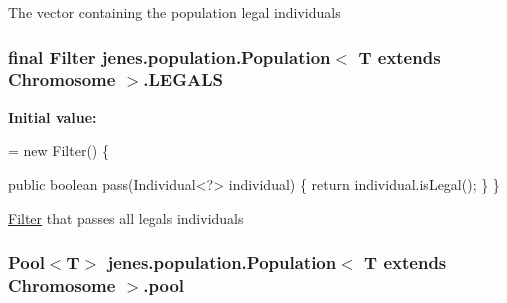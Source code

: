 The vector containing the population legal individuals \hypertarget{classjenes_1_1population_1_1_population_3_01_t_01extends_01_chromosome_01_4_a99a629869951da716c9efc8be2fdbb70}{
\subsubsection[{L\-E\-G\-A\-L\-S}]{\setlength{\rightskip}{0pt plus 5cm}final Filter jenes.\-population.\-Population$<$ T extends Chromosome $>$.L\-E\-G\-A\-L\-S\hspace{0.3cm}{\ttfamily [static]}}}\label{classjenes_1_1population_1_1_population_3_01_t_01extends_01_chromosome_01_4_a99a629869951da716c9efc8be2fdbb70}
{\bfseries Initial value\-:}
\begin{DoxyCode}
= \textcolor{keyword}{new} Filter() \{

        \textcolor{keyword}{public} \textcolor{keywordtype}{boolean} pass(Individual<?> individual) \{
            \textcolor{keywordflow}{return} individual.isLegal();
        \}
    \}
\end{DoxyCode}
\hyperlink{interfacejenes_1_1population_1_1_population_3_01_t_01extends_01_chromosome_01_4_1_1_filter}{Filter} that passes all legals individuals \hypertarget{classjenes_1_1population_1_1_population_3_01_t_01extends_01_chromosome_01_4_a4923c4758a9688ce2c0dce823b79f729}{
\subsubsection[{pool}]{\setlength{\rightskip}{0pt plus 5cm}Pool$<$T$>$ jenes.\-population.\-Population$<$ T extends Chromosome $>$.pool\hspace{0.3cm}{\ttfamily [private]}}}\label{classjenes_1_1population_1_1_population_3_01_t_01extends_01_chromosome_01_4_a4923c4758a9688ce2c0dce823b79f729}
